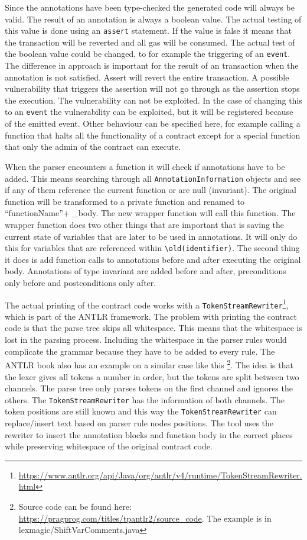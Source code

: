 \documentclass[a4paper]{article}
\begin{document}
Since the annotations have been type-checked the generated code will always be valid. The result of an annotation is always a boolean value. The actual testing of this value is done using an \texttt{assert} statement. If the value is false it means that the transaction will be reverted and all gas will be consumed. The actual test of the boolean value could be changed, to for example the triggering of an \texttt{event}. The difference in approach is important for the result of an transaction when the annotation is not satisfied. Assert will revert the entire transaction. A possible vulnerability that triggers the assertion will not go through as the assertion stops the execution. The vulnerability can not be exploited. In the case of changing this to an \texttt{event} the vulnerability can be exploited, but it will be registered because of the emitted event. Other behaviour can be specified here, for example calling a function that halts all the functionality of a contract except for a special function that only the admin of the contract can execute.\par
When the parser encounters a function it will check if annotations have to be added. This means searching through all \texttt{AnnotationInformation} objects and see if any of them reference the current function or are null (invariant). The original function will be transformed to a private function and renamed to ``functionName''+ \_body. The new wrapper function will call this function. The wrapper function does two other things that are important that is saving the current state of variables that are later to be used in annotations. It will only do this for variables that are referenced within \texttt{\textbackslash old(identifier)}. The second thing it does is add function calls to annotations before and after executing the original body. Annotations of type invariant are added before and after, preconditions only before and postconditions only after. \par
The actual printing of the contract code works with a \texttt{TokenStreamRewriter}\footnote{\url{https://www.antlr.org/api/Java/org/antlr/v4/runtime/TokenStreamRewriter.html}}, which is part of the ANTLR framework. The problem with printing the contract code is that the parse tree skips all whitespace. This means that the whitespace is lost in the parsing process. Including the whitespace in the parser rules would complicate the grammar because they have to be added to every rule. The ANTLR book also has an example on a similar case like this \footnote{Source code can be found here: \url{https://pragprog.com/titles/tpantlr2/source_code}. The example is in lexmagic/ShiftVarComments.java}. The idea is that the lexer gives all tokens a number in order, but the tokens are split between two channels. The parse tree only parses tokens on the first channel and ignores the others. The \texttt{TokenStreamRewriter} has the information of both channels. The token positions are still known and this way the \texttt{TokenStreamRewriter} can replace/insert text based on parser rule nodes positions. The tool uses the rewriter to insert the annotation blocks and function body in the correct places while preserving whitespace of the original contract code.
\end{document}
